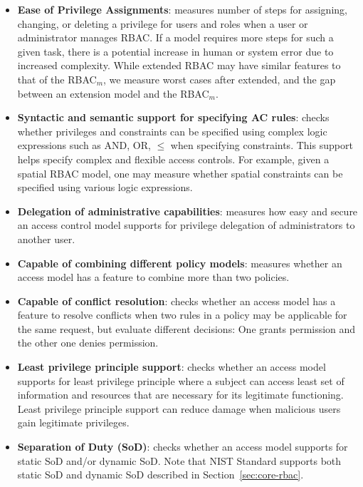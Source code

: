 \begin{itemize}
	\item \textbf{Ease of Privilege Assignments}: measures number of steps for assigning, changing, or deleting a privilege for users and roles when a user or administrator manages RBAC. If a model requires more steps for such a given task, there is a potential increase in human or system error due to increased complexity. While extended RBAC may have similar features to that of the RBAC$_{m}$, we measure worst cases after extended, and the gap between an extension model and the RBAC$_{m}$.
	
	\item \textbf{Syntactic and semantic support for specifying AC rules}: checks whether privileges and constraints can be specified using complex logic expressions such as AND, OR, $\leq$ when specifying constraints. This support helps specify complex and flexible access controls. For example, given a spatial RBAC model, one may measure whether spatial constraints can be specified using various logic expressions.

	\item \textbf{Delegation of administrative capabilities}: measures how easy and secure an access control model supports for privilege delegation of administrators to another user.

	\item \textbf{Capable of combining different policy models}: measures whether an access model has a feature to combine more than two policies.

	\item \textbf{Capable of conflict resolution}: checks whether an access model has a feature to resolve conflicts when two rules in a policy may be applicable for the same request, but evaluate different decisions: One grants permission and the other one denies permission.

	\item \textbf{Least privilege principle support}: checks whether an access model supports for least privilege principle where a subject can access least set of information and resources that are necessary for its legitimate functioning. Least privilege principle support can reduce damage when malicious users gain legitimate privileges.

	\item \textbf{Separation of Duty (SoD)}: checks whether an access model supports for static SoD and/or dynamic SoD. Note that NIST Standard supports both static SoD and dynamic SoD described in Section~\ref{sec:core-rbac}.
\end{itemize}

